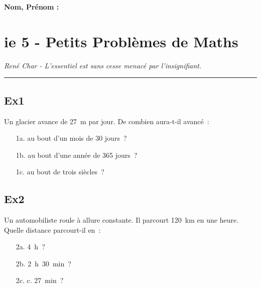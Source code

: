 \documentclass[12pt]{article}
\newcommand{\horrule}[1]{\rule{\linewidth}{#1}} %
\begin{document}
\newpage

\textbf{Nom, Prénom : }

\section*{ie 5 - Petits Problèmes de Maths}
\begin{center}
  \textit{René Char - L’essentiel est sans cesse menacé par l’insignifiant.}
\end{center}
\horrule{2px}


\begin{multicols}{2}
\subsection*{Ex1}
Un glacier avance de 27 m par jour. De combien aura-t-il avancé :
\begin{itemize}
\item[1a.] au bout d’un mois de 30 jours ?
\item[1b.] au bout d’une année de 365 jours ?
\item[1c.] au bout de trois siècles ?
\end{itemize}

\subsection*{Ex2}
Un automobiliste roule à allure constante. Il parcourt 120 km en une heure. Quelle distance parcourt-il en :
\begin{itemize}
\item[2a.] 4 h ? 	
\item[2b.] 2 h 30 min ? 	
\item[2c.] c. 27 min ? 
\end{itemize}
\end{multicols}
\end{document}
